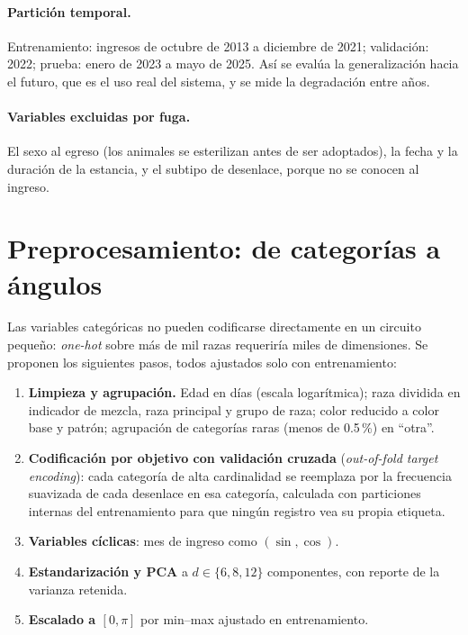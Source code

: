 \documentclass[11pt,letterpaper]{article}
\begin{document}
\paragraph{Partición temporal.} Entrenamiento: ingresos de octubre de 2013 a diciembre de 2021;
validación: 2022; prueba: enero de 2023 a mayo de 2025. Así se evalúa la generalización hacia el
futuro, que es el uso real del sistema, y se mide la degradación entre años.

\paragraph{Variables excluidas por fuga.} El sexo al egreso (los animales se esterilizan antes de ser
adoptados), la fecha y la duración de la estancia, y el subtipo de desenlace, porque no se conocen al
ingreso.

\section{Preprocesamiento: de categorías a ángulos}
Las variables categóricas no pueden codificarse directamente en un circuito pequeño: \emph{one-hot}
sobre más de mil razas requeriría miles de dimensiones. Se proponen los siguientes pasos, todos
ajustados solo con entrenamiento:
\begin{enumerate}[leftmargin=*]
\item \textbf{Limpieza y agrupación.} Edad en días (escala logarítmica); raza dividida en
indicador de mezcla, raza principal y grupo de raza; color reducido a color base y patrón;
agrupación de categorías raras (menos de 0.5\,\%) en ``otra''.
\item \textbf{Codificación por objetivo con validación cruzada} (\emph{out-of-fold target encoding}):
cada categoría de alta cardinalidad se reemplaza por la frecuencia suavizada de cada desenlace en esa
categoría, calculada con particiones internas del entrenamiento para que ningún registro vea su propia
etiqueta.
\item \textbf{Variables cíclicas}: mes de ingreso como $(\sin,\cos)$.
\item \textbf{Estandarización y PCA} a $d\in\{6,8,12\}$ componentes, con reporte de la varianza retenida.
\item \textbf{Escalado a $[0,\pi]$} por min--max ajustado en entrenamiento.
\end{enumerate}
\end{document}
